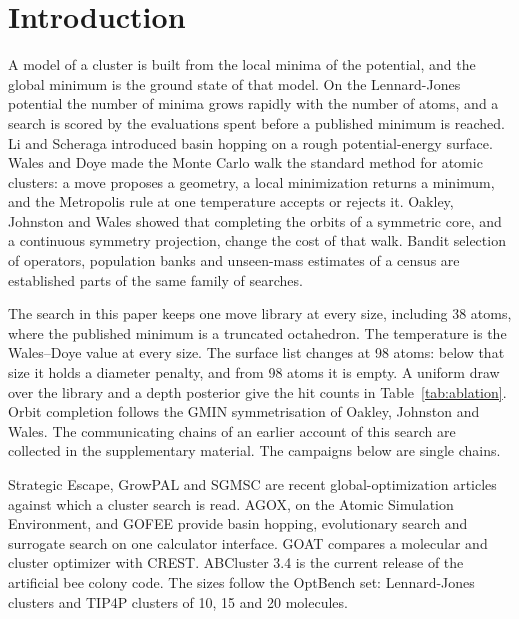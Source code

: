 \documentclass[aip,jcp,preprint,amsmath,amssymb,floatfix]{revtex4-2}
\begin{document}
\section{Introduction}
A model of a cluster is built from the local minima of the potential, and the global minimum is the ground state of that model.\cite{wales2003}
On the Lennard-Jones potential the number of minima grows rapidly with the number of atoms, and a search is scored by the evaluations spent before a published minimum is reached.\cite{wales1997,jones1924,walesCambridgeClusterDatabase}
Li and Scheraga introduced basin hopping on a rough potential-energy surface.\cite{li1987}
Wales and Doye made the Monte Carlo walk the standard method for atomic clusters: a move proposes a geometry, a local minimization returns a minimum, and the Metropolis rule at one temperature accepts or rejects it.\cite{wales1997}
Oakley, Johnston and Wales showed that completing the orbits of a symmetric core, and a continuous symmetry projection, change the cost of that walk.\cite{oakley2013}
Bandit selection of operators, population banks and unseen-mass estimates of a census are established parts of the same family of searches.\cite{thompson1933,fialho2010,russo2018,goodPopulationFrequenciesSpecies1953,leeUnbiasedGlobalOptimization2003}

The search in this paper keeps one move library at every size, including 38 atoms, where the published minimum is a truncated octahedron.\cite{wales1997}
The temperature is the Wales--Doye value at every size.
The surface list changes at 98 atoms: below that size it holds a diameter penalty, and from 98 atoms it is empty.
A uniform draw over the library and a depth posterior give the hit counts in Table~\ref{tab:ablation}.
Orbit completion follows the GMIN symmetrisation of Oakley, Johnston and Wales.\cite{oakley2013}
The communicating chains of an earlier account of this search are collected in the supplementary material.\cite{goswami2023}
The campaigns below are single chains.

Strategic Escape, GrowPAL and SGMSC are recent global-optimization articles against which a cluster search is read.\cite{burkhardt2025,lopezCastroGrowpal2024,zhangSgmsc2026}
AGOX, on the Atomic Simulation Environment, and GOFEE provide basin hopping, evolutionary search and surrogate search on one calculator interface.\cite{christiansenAgox2022,bisboEfficientGlobalStructure2020,larsenAse2017}
GOAT compares a molecular and cluster optimizer with CREST.\cite{deSouzaGoat2025}
ABCluster 3.4 is the current release of the artificial bee colony code.\cite{zhang2015,zhangAbcluster}
The sizes follow the OptBench set: Lennard-Jones clusters and TIP4P clusters of 10, 15 and 20 molecules.\cite{chill2014}
\end{document}
